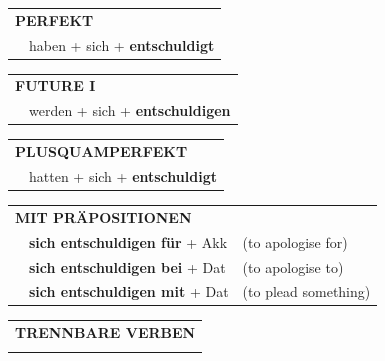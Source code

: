 \documentclass[10pt,a4paper]{revtex4-2}
\begin{document}
\begin{verbbox-acc}
    \vspace{10pt}

 \begin{tabular}{rl}
     \multicolumn{2}{l}{\textbf{PERFEKT}}\\
    &haben + sich + \textbf{entschuldigt}\\
  \end{tabular}
\hfill
   \begin{tabular}{rl}
   
    \multicolumn{2}{l}{\textbf{FUTURE I} }\\
    &werden + sich + \textbf{entschuldigen}\\
 
  \end{tabular}
\hfill
   \begin{tabular}{rl}
      \multicolumn{2}{l}{\textbf{PLUSQUAMPERFEKT}}\\
    &hatten + sich + \textbf{entschuldigt}\\
  \end{tabular}
  
\vspace{10pt}

   \begin{tabular}{lll}
      \multicolumn{3}{l}{\textbf{MIT PRÄPOSITIONEN}}\\
& \textbf{sich entschuldigen für} + Akk & (to apologise for)\\
& \textbf{sich entschuldigen bei} + Dat & (to apologise to)\\
& \textbf{sich entschuldigen mit} + Dat & (to plead something)
  \end{tabular}
  \hfill
   \begin{tabular}{lll}
      \multicolumn{3}{l}{\textbf{TRENNBARE VERBEN}}\\
\vspace{30pt}
 \end{tabular}
  
  \vspace{-5pt}

\end{verbbox-acc}
\end{document}
